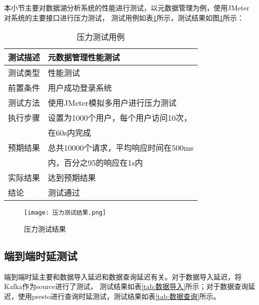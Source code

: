 本小节主要对数据湖分析系统的性能进行测试，以元数据管理为例，使用JMeter对系统的主要接口进行压力测试\cite{33}，
测试用例如表\ref{tab:exampletable16}所示，测试结果如图\ref{fig:badge2}所示：

\begin{table}[H]
  \centering
  \caption{压力测试用例}
  \label{tab:exampletable16}
  \begin{tabular}{ll}
    \toprule
    测试描述         & 元数据管理性能测试         \\
    \midrule
    测试类型         & 性能测试         \\
    前置条件         & 用户成功登录系统         \\
    测试方法         & 使用JMeter模拟多用户进行压力测试        \\
    执行步骤         & 设置为1000个用户，每个用户访问10次，\\
                    &  在60s内完成      \\
    预期结果         & 总共10000个请求，平均响应时间在500ms  \\
                    & 内，百分之95的响应在1s内      \\
    实际结果         & 达到预期结果           \\
    结论            & 测试通过           \\
    \bottomrule
  \end{tabular}
\end{table}

\begin{figure}[H]
  \centering
  \texttt{[image: 压力测试结果.png]}
  \caption{压力测试结果}
  \label{fig:badge2}
\end{figure}

\subsection{端到端时延测试}

端到端时延主要和数据导入延迟和数据查询延迟有关。对于数据导入延迟，将Kafka作为source进行了测试，
测试结果如表\ref{tab:数据导入}所示；对于数据查询延迟，使用presto进行查询时延测试，测试结果如表\ref{tab:数据查询}所示。

